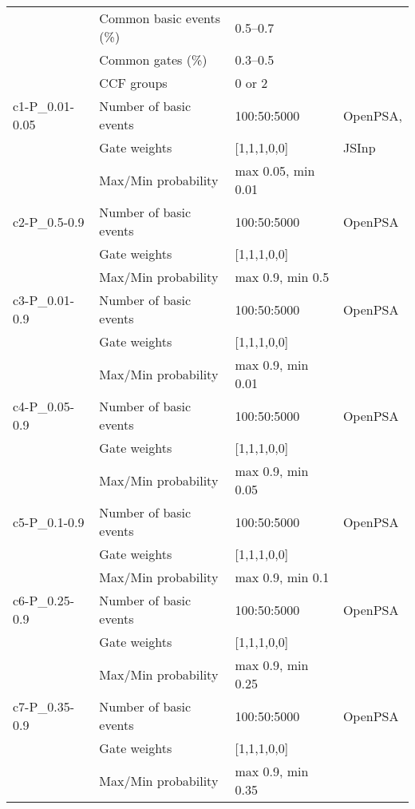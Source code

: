 \begin{longtable}{@{}llll@{}}
                     & Common basic events (\%) & 0.5--0.7                    &          \\
                     & Common gates (\%)      & 0.3--0.5                      &          \\
                     & CCF groups             & 0 or 2                        &          \\
\midrule
c1-P\_0.01-0.05      & Number of basic events & 100:50:5000                   & OpenPSA,\\
                     & Gate weights           & [1,1,1,0,0]                   & JSInp   \\
                     & Max/Min probability    & max 0.05, min 0.01            &                 \\
\midrule
c2-P\_0.5-0.9        & Number of basic events & 100:50:5000                   & OpenPSA \\
                     & Gate weights           & [1,1,1,0,0]                   &         \\
                     & Max/Min probability    & max 0.9, min 0.5              &         \\
\midrule
c3-P\_0.01-0.9       & Number of basic events & 100:50:5000                   & OpenPSA \\
                     & Gate weights           & [1,1,1,0,0]                   &         \\
                     & Max/Min probability    & max 0.9, min 0.01             &         \\
\midrule
c4-P\_0.05-0.9       & Number of basic events & 100:50:5000                   & OpenPSA \\
                     & Gate weights           & [1,1,1,0,0]                   &         \\
                     & Max/Min probability    & max 0.9, min 0.05             &         \\
\midrule
c5-P\_0.1-0.9        & Number of basic events & 100:50:5000                   & OpenPSA \\
                     & Gate weights           & [1,1,1,0,0]                   &         \\
                     & Max/Min probability    & max 0.9, min 0.1              &         \\
\midrule
c6-P\_0.25-0.9       & Number of basic events & 100:50:5000                   & OpenPSA \\
                     & Gate weights           & [1,1,1,0,0]                   &         \\
                     & Max/Min probability    & max 0.9, min 0.25             &         \\
\midrule
c7-P\_0.35-0.9       & Number of basic events & 100:50:5000                   & OpenPSA \\
                     & Gate weights           & [1,1,1,0,0]                   &         \\
                     & Max/Min probability    & max 0.9, min 0.35             &         \\
\bottomrule
\end{longtable}